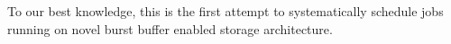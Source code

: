 

To our best knowledge, this is the first attempt to systematically schedule jobs running on novel burst buffer enabled storage architecture.
